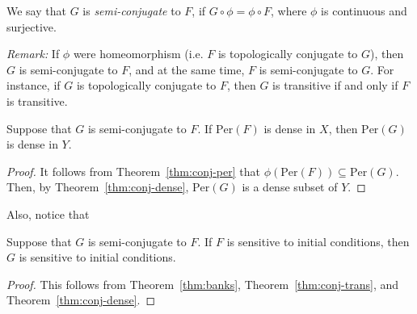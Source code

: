 \documentclass[12pt,draft,twoside]{book}
\begin{document}
  \begin{definition}
    We say that $G$ is \textit{semi-conjugate} to $F$, if $G\circ\phi = \phi\circ F$, where $\phi$ is continuous and surjective.
  \end{definition}
  \textit{Remark:} If $\phi$ were homeomorphism (i.e. $F$ is topologically conjugate to $G$), then $G$ is semi-conjugate to $F$, and at the same time, $F$ is semi-conjugate to $G$.
  For instance, if $G$ is topologically conjugate to $F$, then $G$ is transitive if and only if $F$ is transitive.

  \begin{corollary}
    Suppose that $G$ is semi-conjugate to $F$.
    If $\mathrm{Per}(F)$ is dense in $X$, then $\mathrm{Per}(G)$ is dense in $Y$.
    \label{cor:conj-dense-per}
    \begin{proof}
      It follows from Theorem~\ref{thm:conj-per} that $\phi(\mathrm{Per}(F)) \subseteq \mathrm{Per}(G)$.
      Then, by Theorem~\ref{thm:conj-dense}, $\mathrm{Per}(G)$ is a dense subset of $Y$.
    \end{proof}
\end{corollary}
Also, notice that
\begin{corollary}
  Suppose that $G$ is semi-conjugate to $F$.
  If $F$ is sensitive to initial conditions, then $G$ is sensitive to initial conditions.
  \label{cor:conj-sdic}
  \begin{proof}
  This follows from Theorem~\ref{thm:banks}, Theorem~\ref{thm:conj-trans}, and Theorem~\ref{thm:conj-dense}.
  \end{proof}
\end{corollary}





\printindex
\end{document}
